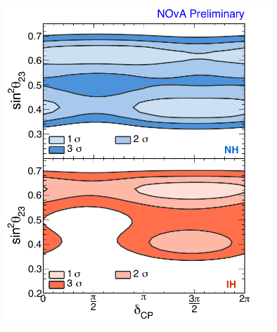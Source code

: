 \begin{figure} [htbp!]
\begin{center}
\includegraphics[width=10cm]{figures/nova_dcp.pdf}
\caption{\label{fig:novadcp}  }
\end{center}
\end{figure}



